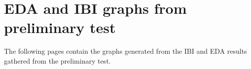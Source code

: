 \chapter{EDA and IBI graphs from preliminary test}\label{app:preliminary}
The following pages contain the graphs generated from the IBI and EDA results gathered from the preliminary test.

